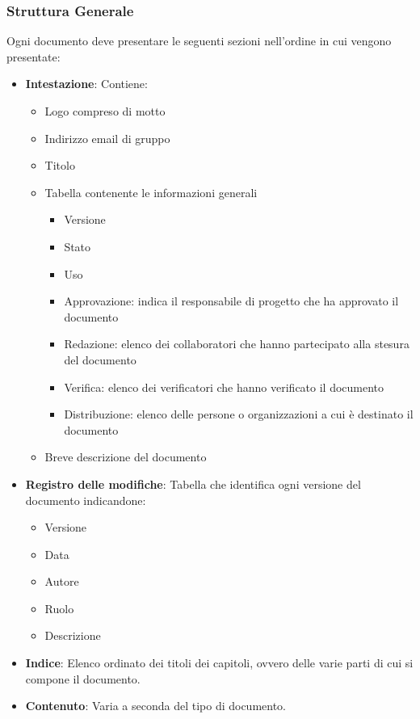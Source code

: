 \subsubsection{Struttura Generale}
Ogni documento deve presentare le seguenti sezioni nell'ordine in cui vengono presentate:
\begin{itemize} 
    \item \textbf{Intestazione}:
    Contiene:
    \begin{itemize} 
        \item Logo compreso di motto
        \item Indirizzo email di gruppo 
        \item Titolo
        \item Tabella contenente le informazioni generali
        \begin{itemize}
            \item Versione
            \item Stato
            \item Uso
            \item Approvazione: indica il responsabile di progetto che ha approvato il documento 
            \item Redazione: elenco dei collaboratori che hanno partecipato alla stesura del documento
            \item Verifica: elenco dei verificatori che hanno verificato il documento
            \item Distribuzione: elenco delle persone o organizzazioni a cui è destinato il documento
        \end{itemize}
        \item Breve descrizione del documento 
    \end{itemize}
    \item \textbf{Registro delle modifiche}:
    Tabella che identifica ogni versione del documento indicandone:
    \begin{itemize} 
        \item Versione
        \item Data
        \item Autore
        \item Ruolo
        \item Descrizione
    \end{itemize}
    \item \textbf{Indice}:
    Elenco ordinato dei titoli dei capitoli, ovvero delle varie parti di cui si compone il documento.
    \item \textbf{Contenuto}:
    Varia a seconda del tipo di documento.
\end{itemize}

